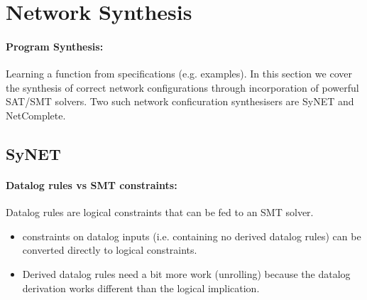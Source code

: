 \section{Network Synthesis}
\paragraph{Program Synthesis: } Learning a function from specifications (e.g. examples).
In this section we cover the synthesis of correct network configurations through incorporation of powerful SAT/SMT solvers. Two such network conficuration synthesisers are SyNET and NetComplete.

\subsection{SyNET}
\begin{minipage}{\linewidth}
    \centering      
    \def\svgwidth{\linewidth}
        
\end{minipage}

\paragraph{Datalog rules vs SMT constraints: } Datalog rules are logical constraints that can be fed to an SMT solver.
\begin{itemize}
    \item constraints on datalog inputs (i.e. containing no derived datalog rules) can be converted directly to logical constraints.
    \item Derived datalog rules need a bit more work (unrolling) because the datalog derivation works different than the logical implication. 
\end{itemize}

